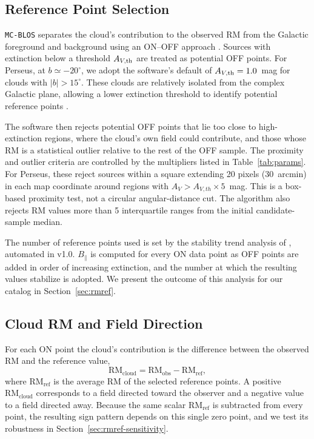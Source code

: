 \documentclass[twocolumn]{aastex701}
\begin{document}
  \subsection{Reference Point Selection}

  \texttt{MC-BLOS} separates the cloud's contribution to the observed RM from the Galactic foreground and background using an ON--OFF approach \citep{tahani2018}. Sources with extinction below a threshold $A_{V,\rm th}$ are treated as potential OFF points. For Perseus, at $b\simeq-20^\circ$, we adopt the software's default of $A_{V,\rm th}=1.0$~mag for clouds with $|b|>15^\circ$. These clouds are relatively isolated from the complex Galactic plane, allowing a lower extinction threshold to identify potential reference points \citep{tahani2025mcblos}.

  The software then rejects potential OFF points that lie too close to
  high-extinction regions, where the cloud's own field could contribute, and
  those whose RM is a statistical outlier relative to the rest of the OFF
  sample. The proximity and outlier criteria are controlled by the multipliers listed
in Table~\ref{tab:params}. For Perseus, these reject sources within
a square extending 20 pixels (30~arcmin) in each map coordinate around
regions with $A_V > A_{V,th}\times 5$~mag. This is a box-based proximity test, not a circular
angular-distance cut. The algorithm also rejects
RM values more than 5 interquartile ranges from the initial candidate-sample median.

  The number of reference points used is set by the stability trend
  analysis of \citet{tahani2018}, automated in v1.0. $B_\parallel$ is computed
  for every ON data point as OFF points are added in order of increasing
  extinction, and the number at which the resulting values stabilize is adopted.
  We present the outcome of this analysis for our catalog in
  Section~\ref{sec:rmref}.

  \subsection{Cloud RM and Field Direction}

  For each ON point the cloud's contribution is the difference between the
  observed RM and the reference value,
  \begin{equation}
  \label{eq:rmcloud}
      \mathrm{RM_{cloud}} = \mathrm{RM_{obs}} - \mathrm{RM_{ref}},
  \end{equation}
  where $\mathrm{RM_{ref}}$ is the average RM of the selected reference points.
  A positive $\mathrm{RM_{cloud}}$ corresponds to a field directed toward the
  observer and a negative value to a field directed away. Because the same
  scalar $\mathrm{RM_{ref}}$ is subtracted from every point, the resulting
  sign pattern depends on this single zero point, and we test its robustness in
  Section~\ref{sec:rmref-sensitivity}.
\end{document}
